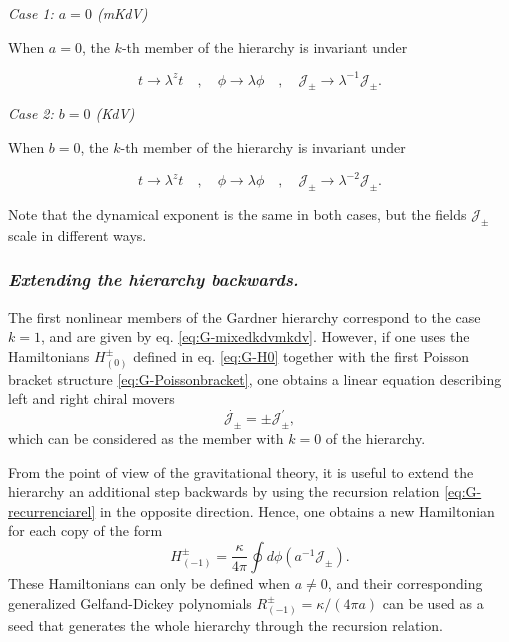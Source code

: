 \documentclass[letterpaper,11pt,oneside]{book}
\begin{document}
\emph{Case 1: $a=0$ (mKdV)}

When $a=0$, the $k$-th member of the hierarchy is invariant under

\begin{equation}
	t\rightarrow\lambda^{z}t\quad,\quad\phi\rightarrow\lambda\phi\quad,\quad\mathcal{J_{\pm}}\rightarrow\lambda^{-1}\mathcal{J_{\pm}}.\label{eq:LifshitzmKdV}
\end{equation}

\emph{Case 2: $b=0$ (KdV)}

When $b=0$, the $k$-th member of the hierarchy is invariant under

\begin{equation}
	t\rightarrow\lambda^{z}t\quad,\quad\phi\rightarrow\lambda\phi\quad,\quad\mathcal{J_{\pm}}\rightarrow\lambda^{-2}\mathcal{J_{\pm}}.\label{eq:LifshitzKdV}
\end{equation}

Note that the dynamical exponent is the same in both cases, but the
fields $\mathcal{J_{\pm}}$ scale in different ways.

\subsubsection*{\emph{Extending the hierarchy backwards.}}

The first nonlinear members of the Gardner hierarchy correspond to
the case $k=1$, and are given by eq. \eqref{eq:G-mixedkdvmkdv}.
However, if one uses the Hamiltonians $H_{\left(0\right)}^{\pm}$
defined in eq. \eqref{eq:G-H0} together with the first Poisson bracket
structure \eqref{eq:G-Poissonbracket}, one obtains a linear equation
describing left and right chiral movers 
\[
\dot{\mathcal{J_{\pm}}}=\pm\mathcal{J_{\pm}^{\prime}},
\]
which can be considered as the member with $k=0$ of the hierarchy.

From the point of view of the gravitational theory, it is useful to
extend the hierarchy an additional step backwards by using the recursion
relation \eqref{eq:G-recurrenciarel} in the opposite direction. Hence,
one obtains a new Hamiltonian for each copy of the form
\begin{equation}
	H_{\left(-1\right)}^{\pm}=\frac{\kappa}{4\pi}\oint d\phi\left(a^{-1}\mathcal{J_{\pm}}\right).\label{eq:G-Hm1}
\end{equation}
These Hamiltonians can only be defined when $a\neq0$, and their corresponding
generalized Gelfand-Dickey polynomials $R_{\left(-1\right)}^{\pm}=\kappa/\left(4\pi a\right)$
can be used as a seed that generates the whole hierarchy through the
recursion relation.
\end{document}
